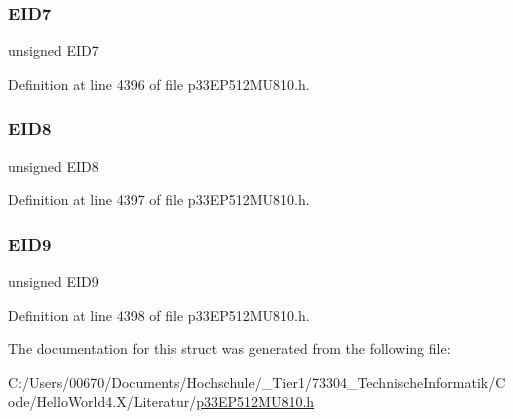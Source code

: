 \subsubsection{\texorpdfstring{E\+I\+D7}{EID7}}
{\footnotesize\ttfamily unsigned E\+I\+D7}



Definition at line 4396 of file p33\+E\+P512\+M\+U810.\+h.

\mbox{\label{structtag_c1_r_x_f11_e_i_d_b_i_t_s_acca25e0b7d86eb499d01f85222baea87}} 
\subsubsection{\texorpdfstring{E\+I\+D8}{EID8}}
{\footnotesize\ttfamily unsigned E\+I\+D8}



Definition at line 4397 of file p33\+E\+P512\+M\+U810.\+h.

\mbox{\label{structtag_c1_r_x_f11_e_i_d_b_i_t_s_ac6748f73d4ada8538b06548be4f396c2}} 
\subsubsection{\texorpdfstring{E\+I\+D9}{EID9}}
{\footnotesize\ttfamily unsigned E\+I\+D9}



Definition at line 4398 of file p33\+E\+P512\+M\+U810.\+h.



The documentation for this struct was generated from the following file\+:\begin{DoxyCompactItemize}
\item 
C\+:/\+Users/00670/\+Documents/\+Hochschule/\+\_\+\+Tier1/73304\+\_\+\+Technische\+Informatik/\+Code/\+Hello\+World4.\+X/\+Literatur/\hyperlink{p33_e_p512_m_u810_8h}{p33\+E\+P512\+M\+U810.\+h}\end{DoxyCompactItemize}

